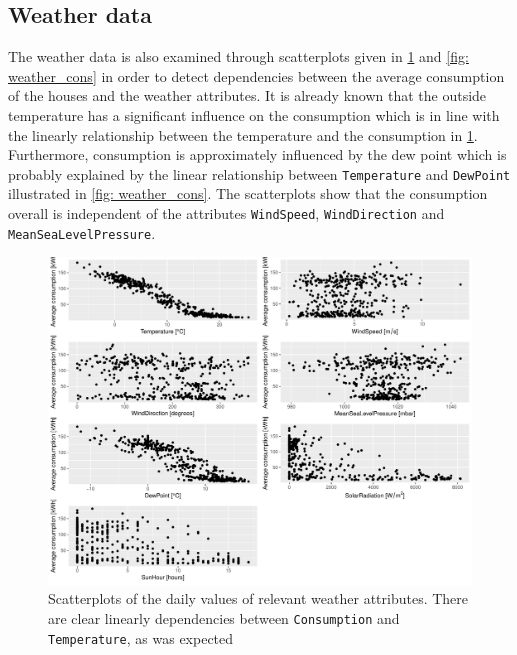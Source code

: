
\subsection{Weather data}
The weather data is also examined through scatterplots given in \cref{fig: weatherpairs} and \cref{fig: weather_cons} in order to detect dependencies between the average consumption of the houses and the weather attributes. It is already known that the outside temperature has a significant influence on the consumption which is in line with the linearly relationship between the temperature and the consumption in \cref{fig: weatherpairs}. Furthermore, consumption is approximately influenced by the dew point which is probably explained by the linear relationship between \texttt{Temperature} and \texttt{DewPoint} illustrated in \cref{fig: weather_cons}. The scatterplots show that the consumption overall is independent of the attributes \texttt{WindSpeed}, \texttt{WindDirection} and \texttt{MeanSeaLevelPressure}. 
\begin{figure}
    \centering
    \includegraphics[width=1.\textwidth]{../../../figures/weatherpairs.pdf}
    \caption{Scatterplots of the daily values of relevant weather attributes. There are clear linearly dependencies between \texttt{Consumption} and \texttt{Temperature}, as was expected}
    \label{fig: weatherpairs}
\end{figure}

